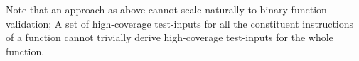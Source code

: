 Note that an approach as above cannot scale naturally to binary function  
validation; A set of high-coverage test-inputs for all the constituent 
instructions of a function cannot trivially derive  high-coverage test-inputs 
for the whole function. 






